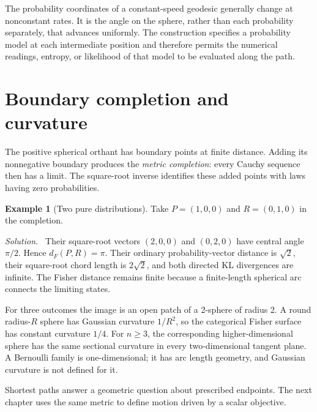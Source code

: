 \documentclass[11pt,oneside,openany]{book}
\theoremstyle{definition}
\newtheorem{example}{Example}[chapter]
\theoremstyle{remark}
\newenvironment{solution}{\par\smallskip\noindent\textit{Solution.}\ }{\par\smallskip}
\numberwithin{equation}{chapter}
\begin{document}
The probability coordinates of a constant-speed geodesic generally change at nonconstant rates. It is the angle on the sphere, rather than each probability separately, that advances uniformly. The construction specifies a probability model at each intermediate position and therefore permits the numerical readings, entropy, or likelihood of that model to be evaluated along the path.

\section{Boundary completion and curvature}
The positive spherical orthant has boundary points at finite distance. Adding its nonnegative boundary produces the \emph{metric completion}: every Cauchy sequence then has a limit. The square-root inverse identifies these added points with laws having zero probabilities.

\begin{example}[Two pure distributions]
Take $P=(1,0,0)$ and $R=(0,1,0)$ in the completion.
\begin{solution}
Their square-root vectors $(2,0,0)$ and $(0,2,0)$ have central angle $\pi/2$. Hence $d_F(P,R)=\pi$. Their ordinary probability-vector distance is $\sqrt2$, their square-root chord length is $2\sqrt2$, and both directed KL divergences are infinite. The Fisher distance remains finite because a finite-length spherical arc connects the limiting states.
\end{solution}
\end{example}

For three outcomes the image is an open patch of a 2-sphere of radius 2. A round radius-$R$ sphere has Gaussian curvature $1/R^2$, so the categorical Fisher surface has constant curvature $1/4$. For $n\geq3$, the corresponding higher-dimensional sphere has the same sectional curvature in every two-dimensional tangent plane. A Bernoulli family is one-dimensional; it has arc length geometry, and Gaussian curvature is not defined for it.

Shortest paths answer a geometric question about prescribed endpoints. The next chapter uses the same metric to define motion driven by a scalar objective.

\FloatBarrier
\end{document}
